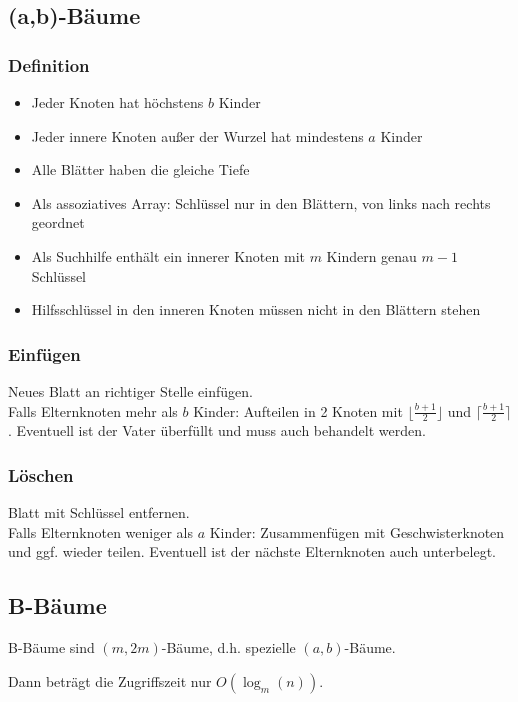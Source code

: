 \documentclass[11pt]{scrartcl}
\begin{document}
\subsection{(a,b)-Bäume}

\subsubsection{Definition}
\begin{itemize}
	\item Jeder Knoten hat höchstens $b$ Kinder
    \item Jeder innere Knoten außer der Wurzel hat mindestens $a$ Kinder
    \item Alle Blätter haben die gleiche Tiefe
    \item Als assoziatives Array: Schlüssel nur in den Blättern, von links nach rechts geordnet
    \item Als Suchhilfe enthält ein innerer Knoten mit $m$ Kindern genau $m − 1$ Schlüssel
    \item Hilfsschlüssel in den inneren Knoten müssen nicht in den Blättern stehen
\end{itemize}

\subsubsection{Einfügen}
Neues Blatt an richtiger Stelle einfügen. \\
Falls Elternknoten mehr als $b$ Kinder: Aufteilen in 2 Knoten mit $\lfloor \frac{b+1}{2} \rfloor$ und $\lceil \frac{b+1}{2} \rceil$. Eventuell ist der Vater überfüllt und muss auch behandelt werden.

\subsubsection{Löschen}
Blatt mit Schlüssel entfernen. \\
Falls Elternknoten weniger als $a$ Kinder: Zusammenfügen mit Geschwisterknoten und ggf. wieder teilen. Eventuell ist der nächste Elternknoten auch unterbelegt.

\subsection{B-Bäume}

B-Bäume sind $(m, 2m)$-Bäume, d.h. spezielle $(a,b)$-Bäume.

Dann beträgt die Zugriffszeit nur $O(\log_m(n))$.
\end{document}
